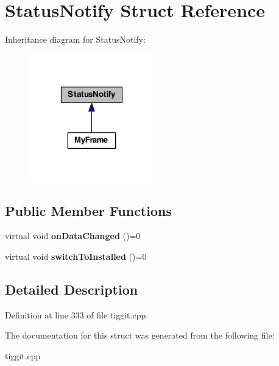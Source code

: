 \hypertarget{struct_status_notify}{\section{Status\-Notify Struct Reference}
\label{struct_status_notify}
}


Inheritance diagram for Status\-Notify\-:
\nopagebreak
\begin{figure}[H]
\begin{center}
\leavevmode
\includegraphics[width=154pt]{struct_status_notify__inherit__graph}
\end{center}
\end{figure}
\subsection*{Public Member Functions}
\begin{DoxyCompactItemize}
\item 
\hypertarget{struct_status_notify_afcf37ad77a3d23537ddbb098bed1a19b}{virtual void {\bfseries on\-Data\-Changed} ()=0}\label{struct_status_notify_afcf37ad77a3d23537ddbb098bed1a19b}

\item 
\hypertarget{struct_status_notify_ac6e45da5a5caf36785a32ae6ad70f711}{virtual void {\bfseries switch\-To\-Installed} ()=0}\label{struct_status_notify_ac6e45da5a5caf36785a32ae6ad70f711}

\end{DoxyCompactItemize}


\subsection{Detailed Description}


Definition at line 333 of file tiggit.\-cpp.



The documentation for this struct was generated from the following file\-:\begin{DoxyCompactItemize}
\item 
tiggit.\-cpp\end{DoxyCompactItemize}
